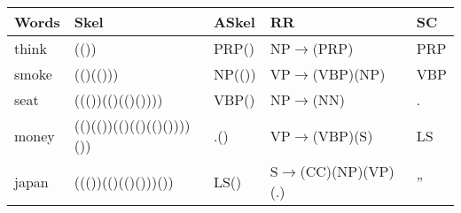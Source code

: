 \begin{frame}
\begin{center}
{    \begin{tabular}{|l|l|l|l|l|}
        \hline
        \textbf{Words} & \textbf{Skel} & \textbf{ASkel} & \textbf{RR }& \textbf{SC }\\
        \hline
        think & (())                      &  PRP() &  NP$\rightarrow$(PRP)         &  PRP\\
        smoke &  (()(()))                 &  NP(())&  VP$\rightarrow$(VBP)(NP)     &  VBP\\
        seat &  ((())(()(()())))          &  VBP() &  NP$\rightarrow$(NN)          &  .  \\
        money &  (()(())(()(()(()())))()) &  .()   &  VP$\rightarrow$(VBP)(S)      &  LS \\
        japan &  ((())(()(()()))())       &  LS()  &  S$\rightarrow$(CC)(NP)(VP)(.)&  '' \\
        \hline
    \end{tabular}

}
\end{center}
\end{frame}

